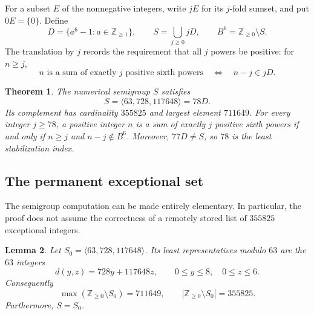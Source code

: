 \documentclass[11pt,a4paper]{article}
\numberwithin{equation}{section}
\newtheorem{theorem}{Theorem}[section]
\newtheorem{lemma}[theorem]{Lemma}
\theoremstyle{remark}
\begin{document}
For a subset $E$ of the nonnegative integers, write $jE$ for its $j$-fold
sumset, and put $0E=\{0\}$. Define
\begin{equation}\label{war:def}
 D=\{a^6-1:a\in\mathbb Z_{\geq1}\},\qquad
 S=\bigcup_{j\geq0}jD,\qquad
 B^6=\mathbb Z_{\geq0}\setminus S.
\end{equation}
The translation by $j$ records the requirement that all $j$ powers be
positive: for $n\geq j$,
\begin{equation}\label{war:translation}
 n\text{ is a sum of exactly }j\text{ positive sixth powers}
 \quad\Longleftrightarrow\quad n-j\in jD.
\end{equation}

\begin{theorem}\label{war:main}
The numerical semigroup $S$ satisfies
\[
 S=\langle63,728,117648\rangle=78D.
\]
Its complement has cardinality $355825$ and largest element $711649$.
For every integer $j\geq78$, a positive integer $n$ is a sum of exactly $j$
positive sixth powers if and only if $n\geq j$ and $n-j\notin B^6$.
Moreover, $77D\ne S$, so $78$ is the least stabilization index.
\end{theorem}

\subsection{The permanent exceptional set}

The semigroup computation can be made entirely elementary. In particular,
the proof does not assume the correctness of a remotely stored list of
$355825$ exceptional integers.

\begin{lemma}\label{war:semigroup}
Let $S_0=\langle63,728,117648\rangle$. Its least representatives modulo $63$
are the $63$ integers
\begin{equation}\label{war:apery}
 d(y,z)=728y+117648z,
 \qquad 0\leq y\leq8,\quad 0\leq z\leq6.
\end{equation}
Consequently
\begin{equation}\label{war:gaps}
 \max(\mathbb Z_{\geq0}\setminus S_0)=711649,
 \qquad
 |\mathbb Z_{\geq0}\setminus S_0|=355825.
\end{equation}
Furthermore, $S=S_0$.
\end{lemma}
\end{document}
